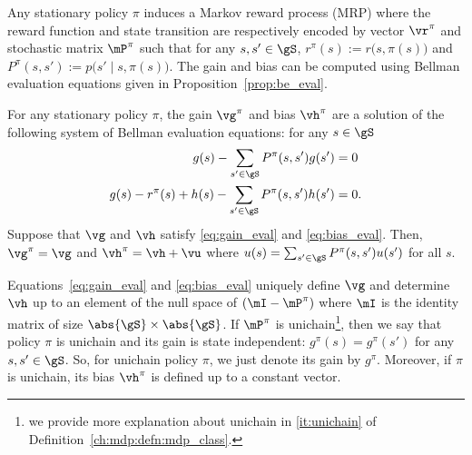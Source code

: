 Any stationary policy $\pi$ induces a Markov reward process (MRP) where the reward function and state transition are respectively encoded by vector $\vr^\pi$ and stochastic matrix $\mP^\pi$ such that for any $s,s'\in\gS$, $r^\pi(s):=r\big(s,\pi(s)\big)$ and $P^\pi(s,s'):=p\big(s'\mid s,\pi(s)\big)$.
The gain and bias can be computed using Bellman evaluation equations given in Proposition~\ref{prop:be_eval}.
\begin{prop}
    \label{prop:be_eval}
    For any stationary policy $\pi$, the gain $\vg^\pi$ and bias $\vh^\pi$ are a solution of the following system of Bellman evaluation equations: for any $s\in\gS$
    \begin{align}
        g(s) -\sum_{s'\in\gS}P^\pi(s,s')g(s') &=0 \label{eq:gain_eval}\\
        g(s) -r^\pi(s) +h(s) -\sum_{s'\in\gS}P^\pi(s,s')h(s') &=0. \label{eq:bias_eval}
    \end{align}
    Suppose that $\vg$ and $\vh$ satisfy \eqref{eq:gain_eval} and \eqref{eq:bias_eval}. Then, $\vg^\pi=\vg$ and $\vh^\pi=\vh+\vu$ where $u(s)=\sum_{s'\in\gS}P^\pi(s,s')u(s')$ for all $s$.
\end{prop}
Equations~\eqref{eq:gain_eval} and \eqref{eq:bias_eval} uniquely define $\vg$ and determine $\vh$ up to an element of the null space of $(\mI-\mP^\pi)$ where $\mI$ is the identity matrix of size $\abs{\gS}\times\abs{\gS}$.
If $\mP^\pi$ is unichain\footnote{we provide more explanation about unichain in \ref{it:unichain} of Definition~\ref{ch:mdp:defn:mdp_class}.}, then we say that policy $\pi$ is unichain and its gain is state independent: $g^\pi(s)=g^\pi(s')$ for any $s,s'\in\gS$.
So, for unichain policy $\pi$, we just denote its gain by $g^\pi$.
Moreover, if $\pi$ is unichain, its bias $\vh^\pi$ is defined up to a constant vector.

